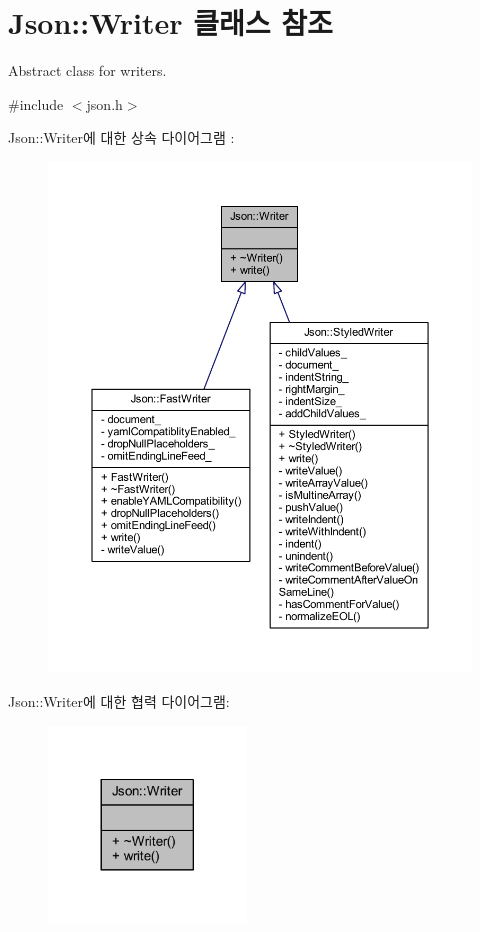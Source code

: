 \hypertarget{class_json_1_1_writer}{}\section{Json\+:\+:Writer 클래스 참조}
\label{class_json_1_1_writer}


Abstract class for writers.  




{\ttfamily \#include $<$json.\+h$>$}



Json\+:\+:Writer에 대한 상속 다이어그램 \+: \nopagebreak
\begin{figure}[H]
\begin{center}
\leavevmode
\includegraphics[width=350pt]{class_json_1_1_writer__inherit__graph}
\end{center}
\end{figure}


Json\+:\+:Writer에 대한 협력 다이어그램\+:\nopagebreak
\begin{figure}[H]
\begin{center}
\leavevmode
\includegraphics[width=149pt]{class_json_1_1_writer__coll__graph}
\end{center}
\end{figure}
